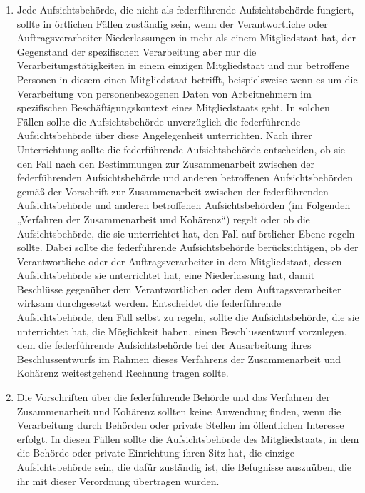 \begin{enumerate}
   \item Jede Aufsichtsbehörde, die nicht als federführende Aufsichtsbehörde fungiert, sollte in örtlichen Fällen
    zuständig sein, wenn der Verantwortliche oder Auftragsverarbeiter Niederlassungen in mehr als einem Mitgliedstaat
    hat, der Gegenstand der spezifischen Verarbeitung aber nur die Verarbeitungstätigkeiten in einem einzigen
    Mitgliedstaat und nur betroffene Personen in diesem einen Mitgliedstaat betrifft, beispielsweise wenn es um die
    Verarbeitung von personenbezogenen Daten von Arbeitnehmern im spezifischen Beschäftigungskontext eines
    Mitgliedstaats geht. In solchen Fällen sollte die Aufsichtsbehörde unverzüglich die federführende Aufsichtsbehörde
    über diese Angelegenheit unterrichten. Nach ihrer Unterrichtung sollte die federführende Aufsichtsbehörde
    entscheiden, ob sie den Fall nach den Bestimmungen zur Zusammenarbeit zwischen der federführenden Aufsichtsbehörde
    und anderen betroffenen Aufsichtsbehörden gemäß der Vorschrift zur Zusammenarbeit zwischen der federführenden
    Aufsichtsbehörde und anderen betroffenen Aufsichtsbehörden (im Folgenden „Verfahren der Zusammenarbeit und
    Kohärenz“) regelt oder ob die Aufsichtsbehörde, die sie unterrichtet hat, den Fall auf örtlicher Ebene regeln
    sollte. Dabei sollte die federführende Aufsichtsbehörde berücksichtigen, ob der Verantwortliche oder der
    Auftragsverarbeiter in dem Mitgliedstaat, dessen Aufsichtsbehörde sie unterrichtet hat, eine Niederlassung hat,
    damit Beschlüsse gegenüber dem Verantwortlichen oder dem Auftragsverarbeiter wirksam durchgesetzt werden.
    Entscheidet die federführende Aufsichtsbehörde, den Fall selbst zu regeln, sollte die Aufsichtsbehörde, die sie
    unterrichtet hat, die Möglichkeit haben, einen Beschlussentwurf vorzulegen, dem die federführende Aufsichtsbehörde
    bei der Ausarbeitung ihres Beschlussentwurfs im Rahmen dieses Verfahrens der Zusammenarbeit und Kohärenz
    weitestgehend Rechnung tragen sollte.%
   \label{eg:127}
   

   \item Die Vorschriften über die federführende Behörde und das Verfahren der Zusammenarbeit und Kohärenz sollten keine
    Anwendung finden, wenn die Verarbeitung durch Behörden oder private Stellen im öffentlichen Interesse erfolgt. In
    diesen Fällen sollte die Aufsichtsbehörde des Mitgliedstaats, in dem die Behörde oder private Einrichtung ihren
    Sitz hat, die einzige Aufsichtsbehörde sein, die dafür zuständig ist, die Befugnisse auszuüben, die ihr mit dieser
    Verordnung übertragen wurden.%
   \label{eg:128}
   

\end{enumerate}
